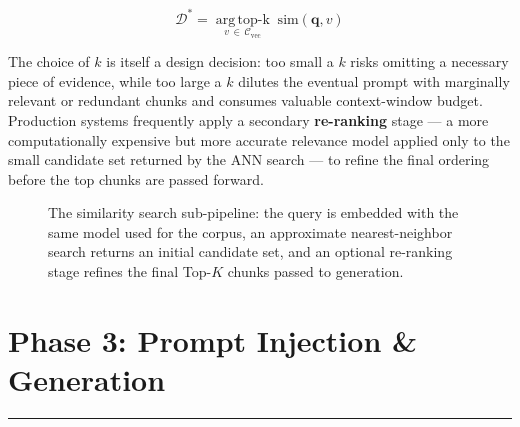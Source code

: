 \documentclass[11pt,a4paper]{article}
\newcommand{\sectionrule}{\vspace{-0.2cm}\noindent\textcolor{ragblue!40}{\rule{\linewidth}{0.6pt}}\vspace{0.3cm}}
\begin{document}
\begin{equation}
\mathcal{D}^{*} = \operatorname*{arg\,top\text{-}k}_{v \,\in\, \mathcal{C}_{\text{vec}}} \; \text{sim}(\mathbf{q}, v)
\end{equation}

The choice of $k$ is itself a design decision: too small a $k$ risks omitting a necessary piece of evidence, while too large a $k$ dilutes the eventual prompt with marginally relevant or redundant chunks and consumes valuable context-window budget. Production systems frequently apply a secondary \textbf{re-ranking} stage --- a more computationally expensive but more accurate relevance model applied only to the small candidate set returned by the ANN search --- to refine the final ordering before the top chunks are passed forward.

\begin{figure}[htbp]
\centering
{}
\caption{The similarity search sub-pipeline: the query is embedded with the same model used for the corpus, an approximate nearest-neighbor search returns an initial candidate set, and an optional re-ranking stage refines the final Top-$K$ chunks passed to generation.}
\label{fig:similarity-search}
\end{figure}

\newpage

\section{Phase 3: Prompt Injection \& Generation}
\sectionrule
\end{document}
